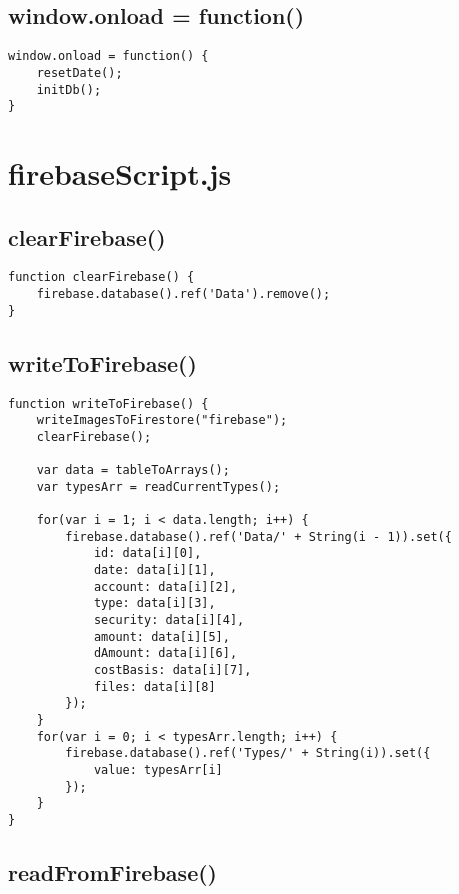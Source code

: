 \documentclass[letterpaper]{article}
\begin{document}
\subsection{window.onload = function()}

\begin{lstlisting}[firstnumber=790]
window.onload = function() {
    resetDate();
    initDb();
}
\end{lstlisting}

\newpage

\section{firebaseScript.js}

\subsection{clearFirebase()}

\begin{lstlisting}[firstnumber=1]
function clearFirebase() {
    firebase.database().ref('Data').remove();
}
\end{lstlisting}

\subsection{writeToFirebase()}

\begin{lstlisting}[firstnumber=5]
function writeToFirebase() {
    writeImagesToFirestore("firebase");
    clearFirebase();

    var data = tableToArrays();
    var typesArr = readCurrentTypes();

    for(var i = 1; i < data.length; i++) {
        firebase.database().ref('Data/' + String(i - 1)).set({
            id: data[i][0],
            date: data[i][1],
            account: data[i][2],
            type: data[i][3],
            security: data[i][4],
            amount: data[i][5],
            dAmount: data[i][6],
            costBasis: data[i][7],
            files: data[i][8]
        });
    }
    for(var i = 0; i < typesArr.length; i++) {
        firebase.database().ref('Types/' + String(i)).set({
            value: typesArr[i]
        });
    }
}
\end{lstlisting}

\subsection{readFromFirebase()}
\end{document}
